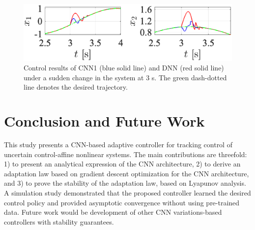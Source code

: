 \documentclass{l4dc2025}
\begin{document}
\begin{figure}[!t]
    \centering
    \includegraphics[width=0.6\linewidth]{imgs/Fig8}
    \caption{Control results of CNN1 (blue solid line) and DNN (red solid line) under a sudden change in the system at $3$ s. The green dash-dotted line denotes the desired trajectory.}
    \label{fig: FCN vs CNN}
\end{figure}



\section{Conclusion and Future Work}
This study presents a CNN-based adaptive controller for tracking control of uncertain control-affine nonlinear systems. The main contributions are threefold: 1) to present an analytical expression of the CNN architecture, 2) to derive an adaptation law based on gradient descent optimization for the CNN architecture, and 3) to prove the stability of the adaptation law, based on Lyapunov analysis. A simulation study demonstrated that the proposed controller learned the desired control policy and provided asymptotic convergence without using pre-trained data. 
Future work would be development of other CNN variations-based controllers with stability guarantees.
\end{document}

